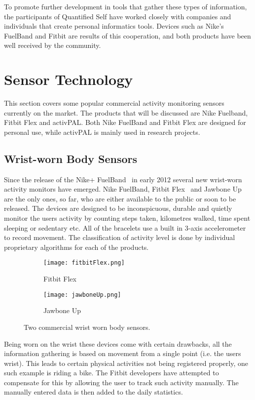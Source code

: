 To promote further development in tools that gather these types of information, the participants of Quantified Self have worked closely with companies and individuals that create personal informatics tools. Devices such as Nike's FuelBand and Fitbit are results of this cooperation, and both products have been well received by the community.

\section{Sensor Technology}
This section covers some popular commercial activity monitoring sensors currently on the market. The products that will be discussed are Nike Fuelband, Fitbit Flex and activPAL. Both Nike FuelBand and Fitbit Flex are designed for personal use, while activPAL is mainly used in research projects.

\subsection{Wrist-worn Body Sensors}
Since the release of the Nike+ FuelBand~\cite{fuelBand} in early 2012 several new wrist-worn activity monitors have emerged. Nike FuelBand, Fitbit Flex~\cite{flex} and Jawbone Up~\cite{jawboneUp} are the only ones, so far, who are either available to the public or soon to be released. The devices are designed to be inconspicuous, durable and quietly monitor the users activity by counting steps taken, kilometres walked, time spent sleeping or sedentary etc. All of the bracelets use a built in 3-axis accelerometer to record movement. The classification of activity level is done by individual proprietary algorithms for each of the products.

\begin{figure}[h!]
  \centering
  \begin{subfigure}[b]{0.3\textwidth}
    \centering
    \texttt{[image: fitbitFlex.png]}
    \caption{Fitbit Flex}
    \label{fig:fitbitFlex}
  \end{subfigure}
  \begin{subfigure}[b]{0.4\textwidth}
    \centering
    \texttt{[image: jawboneUp.png]}
    \caption{Jawbone Up}
    \label{fig:jawboneUp}
  \end{subfigure}
  \caption[Fitbit Flex and Jawbone Up]{Two commercial wrist worn body sensors.}
\end{figure}

Being worn on the wrist these devices come with certain drawbacks, all the information gathering is based on movement from a single point (i.e. the users wrist). This leads to certain physical activities not being registered properly, one such example is riding a bike. The Fitbit developers have attempted to compensate for this by allowing the user to track such activity manually. The manually entered data is then added to the daily statistics. 

